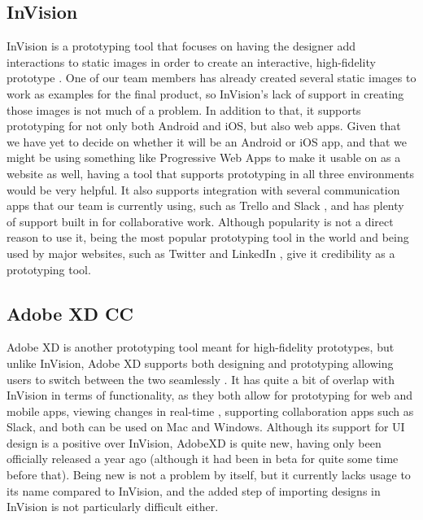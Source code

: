 \documentclass[10pt, letterpaper,draftclsnofoot,onecolumn, compsoc]{IEEEtran}
\begin{document}
\subsection{InVision}
InVision is a prototyping tool that focuses on having the designer add interactions to static images in order to create an interactive, high-fidelity prototype \cite{invision}. One of our team members has already created several static images to work as examples for the final product, so InVision's lack of support in creating those images is not much of a problem. In addition to that, it supports prototyping for not only both Android and iOS, but also web apps. Given that we have yet to decide on whether it will be an Android or iOS app, and that we might be using something like Progressive Web Apps to make it usable on as a website as well, having a tool that supports prototyping in all three environments would be very helpful. It also supports integration with several communication apps that our team is currently using, such as Trello \cite{trelloIV} and Slack \cite{slackIV}, and has plenty of support built in for collaborative work. Although popularity is not a direct reason to use it, being the most popular prototyping tool in the world and being used by major websites, such as Twitter and LinkedIn \cite{11best}, give it credibility as a prototyping tool. 

\subsection{Adobe XD CC}
Adobe XD is another prototyping tool meant for high-fidelity prototypes, but unlike InVision, Adobe XD supports both designing and prototyping allowing users to switch between the two seamlessly \cite{adobexd}. It has quite a bit of overlap with InVision in terms of functionality, as they both allow for prototyping for web and mobile apps, viewing changes in real-time \cite{11best}, supporting collaboration apps such as Slack, and both can be used on Mac and Windows. Although its support for UI design is a positive over InVision, AdobeXD is quite new, having only been officially released a year ago \cite{adobexdbeta} (although it had been in beta for quite some time before that). Being new is not a problem by itself, but it currently lacks usage to its name compared to InVision, and the added step of importing designs in InVision is not particularly difficult either.
\end{document}
